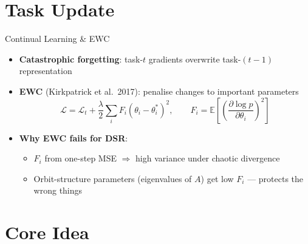 \documentclass[10pt]{beamer}
\begin{document}
\section{Task Update}

\begin{frame}{Continual Learning \& EWC}
\begin{itemize}[<+->]
  \item \textbf{Catastrophic forgetting}: task-$t$ gradients overwrite task-$(t{-}1)$ representation
  \item \textbf{EWC} (Kirkpatrick et al.\ 2017): penalise changes to important parameters
    \[
      \mathcal{L} = \mathcal{L}_t + \frac{\lambda}{2}\sum_i F_i(\theta_i - \theta_i^*)^2,
      \qquad
      F_i = \mathbb{E}\!\left[\!\left(\frac{\partial \log p}{\partial \theta_i}\right)^{\!2}\right]
    \]
  \item \textbf{Why EWC fails for DSR}:
    \begin{itemize}
      \item $F_i$ from one-step MSE $\Rightarrow$ high variance under chaotic divergence
      \item Orbit-structure parameters (eigenvalues of $A$) get low $F_i$ — protects the wrong things
    \end{itemize}
\end{itemize}
\end{frame}

\section{Core Idea}
\end{document}
